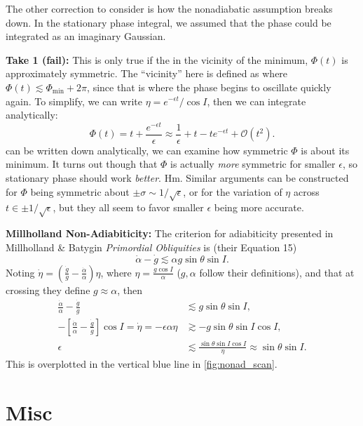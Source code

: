 \documentclass[11pt,
        usenames, %
        dvipsnames %
    ]{article}
\newcommand*{\p}[1]{\left(#1\right)}
\newcommand*{\s}[1]{\left[#1\right]}
\begin{document}
The other correction to consider is how the nonadiabatic assumption breaks down.
In the stationary phase integral, we assumed that the phase could be integrated
as an imaginary Gaussian.

\textbf{Take 1 (fail):} This is only true if the in the
vicinity of the minimum, $\Phi(t)$ is approximately symmetric. The ``vicinity''
here is defined as where $\Phi(t) \lesssim \Phi_{\min} + 2\pi$, since that is
where the phase begins to oscillate quickly again. To simplify, we can write
$\eta = e^{-\epsilon t}/\cos I$, then we can integrate analytically:
\begin{equation}
    \Phi(t) = t + \frac{e^{-\epsilon t}}{\epsilon}
        \approx \frac{1}{\epsilon} + t - te^{-\epsilon t} + \mathcal{O}(t^2).
\end{equation}
can be written down analytically, we can examine how symmetric $\Phi$ is about
its minimum. It turns out though that $\Phi$ is actually \emph{more} symmetric
for smaller $\epsilon$, so stationary phase should work \emph{better}. Hm.
Similar arguments can be constructed for $\Phi$ being symmetric about $\pm
\sigma \sim 1/\sqrt{\epsilon}$, or for the variation of $\eta$ across $t \in \pm
1/\sqrt{\epsilon}$, but they all seem to favor smaller $\epsilon$ being more
accurate.

\textbf{Millholland Non-Adiabiticity:} The criterion for adiabiticity presented
in Millholland \& Batygin \emph{Primordial Obliquities} is (their Equation 15)
\begin{equation}
    \dot{\alpha} - \dot{g} \lesssim \alpha g \sin \theta \sin I.
\end{equation}
Noting $\dot{\eta} = \p{\frac{\dot{g}}{g} - \frac{\dot{\alpha}}{\alpha}}\eta$,
where $\eta = \frac{g\cos I}{\alpha}$ ($g, \alpha$ follow their definitions),
and that at crossing they define $g \approx \alpha$, then
\begin{align*}
    \frac{\dot{\alpha}}{\alpha} - \frac{\dot{g}}{g}
        &\lesssim g\sin\theta\sin I,\\
    -\s{\frac{\dot{\alpha}}{\alpha} - \frac{\dot{g}}{g}}\cos I = \dot{\eta}
        = -\epsilon \alpha \eta &\gtrsim -g\sin\theta\sin I\cos I,\\
    \epsilon &\lesssim \frac{\sin \theta \sin I \cos I}{\eta}
        \approx \sin\theta \sin I.
\end{align*}
This is overplotted in the vertical blue line in \autoref{fig:nonad_scan}.

\section{Misc}
\end{document}
